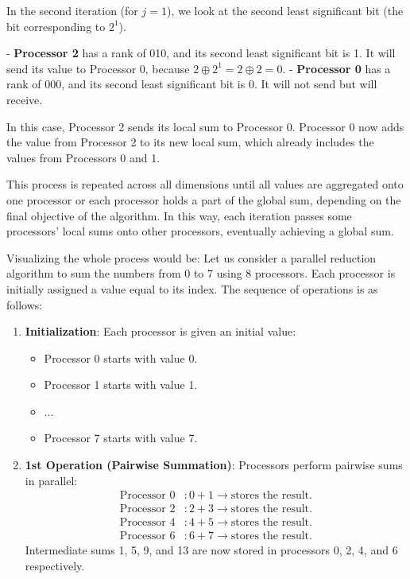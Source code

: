 \documentclass{article}
\begin{document}
\begin{itemize}
\begin{itemize}
In the second iteration (for \(j=1\)), we look at the second least significant bit (the bit corresponding to \(2^1\)).

- \textbf{Processor 2} has a rank of 010, and its second least significant bit is 1. It will send its value to Processor 0, because \(2 \oplus 2^1 = 2 \oplus 2 = 0\).
- \textbf{Processor 0} has a rank of 000, and its second least significant bit is 0. It will not send but will receive.

In this case, Processor 2 sends its local sum to Processor 0. Processor 0 now adds the value from Processor 2 to its new local sum, which already includes the values from Processors 0 and 1.

This process is repeated across all dimensions until all values are aggregated onto one processor or each processor holds a part of the global sum, depending on the final objective of the algorithm. In this way, each iteration passes some processors' local sums onto other processors, eventually achieving a global sum.
      \end{itemize}
    Visualizing the whole process would be: 
Let us consider a parallel reduction algorithm to sum the numbers from 0 to 7 using 8 processors. Each processor is initially assigned a value equal to its index. The sequence of operations is as follows:

\begin{enumerate}
    \item \textbf{Initialization}: Each processor is given an initial value:
    \begin{itemize}
        \item Processor 0 starts with value 0.
        \item Processor 1 starts with value 1.
        \item ...
        \item Processor 7 starts with value 7.
    \end{itemize}
    
    \item \textbf{1st Operation (Pairwise Summation)}: Processors perform pairwise sums in parallel:
    \begin{align*}
        \text{Processor 0} &: 0 + 1 \rightarrow \text{stores the result.} \\
        \text{Processor 2} &: 2 + 3 \rightarrow \text{stores the result.} \\
        \text{Processor 4} &: 4 + 5 \rightarrow \text{stores the result.} \\
        \text{Processor 6} &: 6 + 7 \rightarrow \text{stores the result.}
    \end{align*}
    Intermediate sums 1, 5, 9, and 13 are now stored in processors 0, 2, 4, and 6 respectively.
    

\end{enumerate}
\end{itemize}
\end{document}
